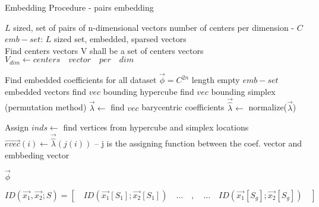 \documentclass{article}
\begin{document}
	\begin{algorithm}
		\caption{Embedding Procedure - pairs embedding}
		\begin{algorithmic}[1]
			
			\REQUIRE $L$ sized, set of pairs of n-dimensional vectors
			\REQUIRE number of centers per dimension - $C$
			\ENSURE $emb-set$: $L$ sized set, embedded, sparsed vectors\\
			
			\STATE Find centers vectors
			\STATE V shall be a set of centers vectors
			\STATE $V_{dim} \leftarrow centers \quad vector \quad per \quad dim$
			\ENDFOR
			
			\STATE Find embedded coefficients for all dataset
			\STATE $\overrightarrow{\phi} = C^{2n}$ length empty $emb-set$ embedded vectors
			\STATE find $vec$ bounding hypercube 
			\STATE find $vec$ bounding simplex (permutation method)
			\STATE $\overrightarrow{\lambda} \leftarrow$ find $vec$ barycentric coefficients 
			\STATE $\overrightarrow{\hat{\lambda}} \leftarrow$ normalize($\overrightarrow{\lambda}$)
			\ENDFOR
			
			\STATE Assign
			\STATE $inds \leftarrow$ find vertices from hypercube and simplex locations
			\STATE $\overrightarrow{evec}(i) \leftarrow \overrightarrow{\hat{\lambda}}(j(i))$ -- j is the assigning function between the coef. vector and embbeding vector
			\ENDFOR
			\ENDFOR
			
			\RETURN $\overrightarrow{\phi}$
			
		\end{algorithmic}
	\end{algorithm}
	
$	ID( \overrightarrow{x_1} , \overrightarrow{x_2}; S) = [ \quad ID( \overrightarrow{x_1}[S_1] ; \overrightarrow{x_2}[S_1])\quad \dots \quad , \quad \dots \quad ID( \overrightarrow{x_1}[S_{g} ] ; \overrightarrow{x_2}[S_{g}] )\quad]$
	

	
	
\end{document}
